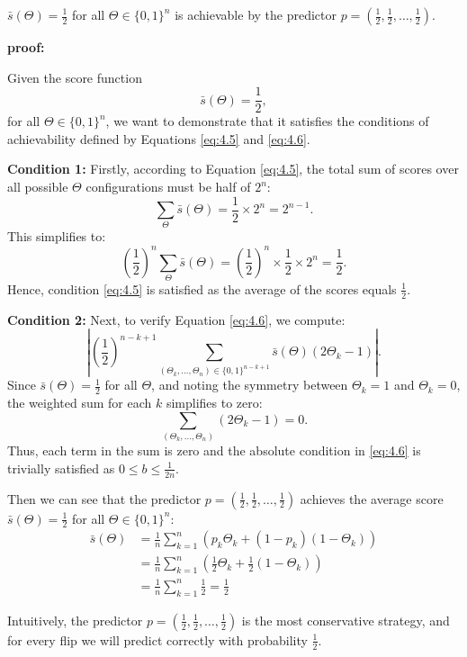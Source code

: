 \documentclass[11pt]{article}
\numberwithin{equation}{section}
\theoremstyle{boldStyle}
\begin{document}
$\bar{s}(\Theta) = \frac{1}{2}$ for all $\Theta \in \{0, 1\}^n$ is achievable by the predictor 
${p} = (\frac{1}{2}, \frac{1}{2}, \ldots, \frac{1}{2})$.

\textbf{proof: }

Given the score function
\[
\bar{s}(\Theta) = \frac{1}{2},
\]
for all $\Theta \in \{0, 1\}^n$, we want to demonstrate that it satisfies the conditions of achievability defined by Equations \ref{eq:4.5} and \ref{eq:4.6}.

\textbf{Condition 1:}
Firstly, according to Equation \ref{eq:4.5}, the total sum of scores over all possible $\Theta$ configurations must be half of $2^n$:
\[
\sum_{\Theta} \bar{s}(\Theta) = \frac{1}{2} \times 2^n = 2^{n-1}.
\]
This simplifies to:
\[
\left(\frac{1}{2}\right)^n \sum_{\Theta} \bar{s}(\Theta) = \left(\frac{1}{2}\right)^n \times \frac{1}{2} \times 2^{n} = \frac{1}{2}.
\]
Hence, condition \ref{eq:4.5} is satisfied as the average of the scores equals $\frac{1}{2}$.

\textbf{Condition 2:}
Next, to verify Equation \ref{eq:4.6}, we compute:
\[
\left| \left(\frac{1}{2}\right)^{n-k+1} \sum_{(\Theta_k, \ldots, \Theta_n) \in \{0,1\}^{n-k+1}} \bar{s}(\Theta) (2\Theta_k - 1) \right|.
\]
Since $\bar{s}(\Theta) = \frac{1}{2}$ for all $\Theta$, and noting the symmetry between $\Theta_k = 1$ and $\Theta_k = 0$, the weighted sum for each $k$ simplifies to zero:
\[
\sum_{(\Theta_k, \ldots, \Theta_n)} (2\Theta_k - 1) = 0.
\]
Thus, each term in the sum is zero and the absolute condition in \ref{eq:4.6} 
is trivially satisfied as $0 \leq b \leq \frac{1}{2n}$.

Then we can see that the predictor $p = (\frac{1}{2}, \frac{1}{2}, \ldots, \frac{1}{2})$ achieves the average score $\bar{s}(\Theta) = \frac{1}{2}$ for all $\Theta \in \{0, 1\}^n$: 
\begin{equation*}
    \begin{aligned}
        \bar{s}(\Theta) &= \frac{1}{n} \sum_{k=1}^{n} \left( p_k \Theta_k + (1 - p_k)(1 - \Theta_k) \right) \\
        &= \frac{1}{n} \sum_{k=1}^{n} \left( \frac{1}{2} \Theta_k + \frac{1}{2} (1 - \Theta_k) \right) \\
        &= \frac{1}{n} \sum_{k=1}^{n} \frac{1}{2} = \frac{1}{2}
    \end{aligned}
\end{equation*}

Intuitively, the predictor $p = (\frac{1}{2}, \frac{1}{2}, \ldots, \frac{1}{2})$ is the most conservative strategy, 
and for every flip we will predict correctly with probability $\frac{1}{2}$.
\end{document}
